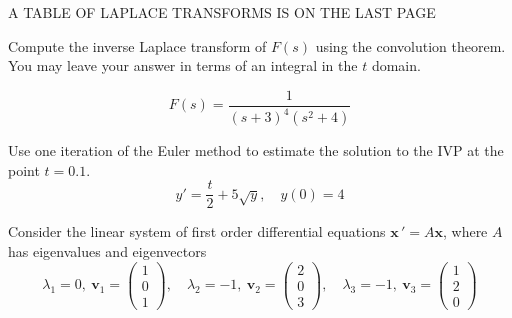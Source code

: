 \documentclass[11pt]{exam}
\begin{document}
    
    


\vspace{1cm}
\begin{center}
    A TABLE OF LAPLACE TRANSFORMS IS ON THE LAST PAGE
\end{center}


\newpage \InitialsRight

\begin{questions}


    \question[6] %
    Compute the inverse Laplace transform of $F(s)$ using the convolution theorem. You may leave your answer in terms of an integral in the $t$ domain. 
    
    $$F(s) = \frac{1}{(s+3)^4(s^2+4)}$$  %
    
    \vspace{8cm} 
    
    \question[2] %
    Use one iteration of the Euler method to estimate the solution to the IVP at the point $t = 0.1$. 
    $$y' = \frac t2 + 5\sqrt y, \quad y(0) = 4$$ %
    
    
    
\newpage \InitialsLeft

    \question[6] Consider the linear system of first order differential equations $\displaystyle \mathbf x \, ' = A \mathbf x$, where $A$ has eigenvalues and eigenvectors 
    $$\lambda_1 = 0, \ \mathbf v_1 = \begin{pmatrix} 1 \\ 0 \\ 1 \end{pmatrix}, 
    \quad \lambda _2 = -1 , \  \mathbf v_2 = \begin{pmatrix} 2 \\ 0 \\ 3 \end{pmatrix}, 
    \quad \lambda _3 = -1 , \  \mathbf v_3 = \begin{pmatrix} 1 \\ 2 \\ 0 \end{pmatrix} 
    $$
    

\end{questions}
\end{document}
